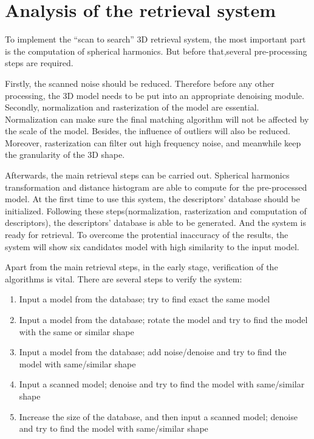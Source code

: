 \section{Analysis of the retrieval system}

To implement the ``scan to search'' 3D retrieval system, the most important part is the computation of spherical harmonics. But before that,several pre-processing steps are required. 

Firstly, the scanned noise should be reduced. Therefore before any other processing, the 3D model needs to be put into an appropriate denoising module. Secondly, normalization and rasterization of the model are essential. Normalization can make sure the final matching algorithm will not be affected by the scale of the model. Besides, the influence of outliers will also be reduced. Moreover, rasterization can filter out high frequency noise, and meanwhile keep the granularity of the 3D shape. 

Afterwards, the main retrieval steps can be carried out. Spherical harmonics transformation and distance histogram are able to compute for the pre-processed model. At the first time to use this system, the descriptors' database should be initialized. Following these steps(normalization, rasterization and computation of descriptors), the descriptors' database is able to be generated. And the system is ready for retrieval. To overcome the protential inaccuracy of the results, the system will show six candidates model with high similarity to the input model.

Apart from the main retrieval steps, in the early stage, verification of the algorithms is vital. There are several steps to verify the system: 

\begin{enumerate}[1)]
\item Input a model from the database; try to find exact the same model
\item Input a model from the database; rotate the model and try to find the model with the same or similar shape
\item Input a model from the database; add noise/denoise and try to find the model with same/similar shape
\item Input a scanned model; denoise and try to find the model with same/similar shape
\item Increase the size of the database, and then input a scanned model; denoise and try to find the model with same/similar shape
\end{enumerate}

